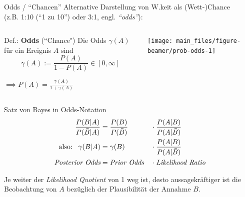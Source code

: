 \documentclass[
  10pt,
  ignorenonframetext,
]{beamer}
\begin{document}
\begin{frame}{Odds / ``Chancen''}
\label{odds-chancen}
Alternative Darstellung von W.keit als (Wett-)Chance\\
(z.B. 1:10 (``1 zu 10'') oder 3:1, engl. \emph{``odds''}):

\begin{columns}
\begin{column}{0.5\textwidth}
\begin{block}{Def.: \textbf{Odds} (``Chance")} 
Die Odds $\gamma(A)$ für ein Ereignis $A$ sind
$$\gamma(A) := \frac{P(A)}{1 - P(A)} \in [0, \infty]$$
\end{block}
$\implies P(A) = \frac{\gamma(A)}{1 + \gamma(A)}$
\end{column}
\begin{column}{0.5\textwidth}
\scriptsize

\begin{center}\texttt{[image: main\_files/figure-beamer/prob-odds-1]} \end{center}

\normalsize
\end{column}
\end{columns}
\end{frame}

\begin{frame}{Satz von Bayes in Odds-Notation}
\label{satz-von-bayes-in-odds-notation}
\begin{alignat*}{3}
\frac{P(B|A)}{P(\bar{B}|A)} & = \frac{P(B)}{P(\bar{B})} &&\cdot \frac{P(A|B)}{P(A|\bar{B})}\\
\text{also:\;\;\;} \gamma(B|A) &= \gamma(B) &&\cdot \frac{P(A|B)}{P(A|\bar{B})}\\
\mbox{\em Posterior Odds} &=  \mbox{\em Prior Odds} &&\cdot \mbox{\em Likelihood Ratio}
\end{alignat*}

Je weiter der \emph{Likelihood Quotient} von 1 weg ist, desto
aussagekräftiger ist die Beobachtung von \(A\) bezüglich der
Plausibilität der Annahme \(B\).
\end{frame}
\end{document}
